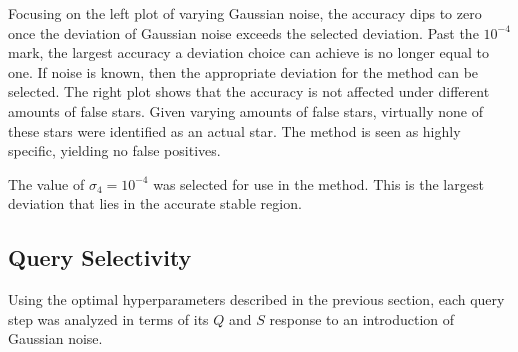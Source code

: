 Focusing on the left plot of varying Gaussian noise, the accuracy dips to zero once the deviation of Gaussian noise
exceeds the selected deviation.
Past the $10^{-4}$ mark, the largest accuracy a deviation choice can achieve is no longer equal to one.
If noise is known, then the appropriate deviation for the  method can be selected.
The right plot shows that the accuracy is not affected under different amounts of false stars.
Given varying amounts of false stars, virtually none of these stars were identified as an actual star.
The  method is seen as highly specific, yielding no false positives.

The value of $\sigma_4 = 10^{-4}$ was selected for use in the  method.
This is the largest deviation that lies in the accurate stable region.

\subsection{Query Selectivity}\label{subsec:querySelectivityResults}
Using the optimal hyperparameters described in the previous section, each query step was analyzed in terms of its
$Q$ and $S$ response to an introduction of Gaussian noise.


